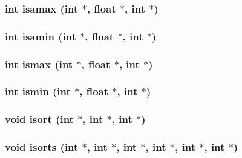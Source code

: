 \subsubsection{\setlength{\rightskip}{0pt plus 5cm}int isamax (int $\ast$, float $\ast$, int $\ast$)}\label{essl_8h_dbbeac12af3cfccc5b32aad8f83be325}


\subsubsection{\setlength{\rightskip}{0pt plus 5cm}int isamin (int $\ast$, float $\ast$, int $\ast$)}\label{essl_8h_32ac278a6a27427e5d14cbfe2cccdc0a}


\subsubsection{\setlength{\rightskip}{0pt plus 5cm}int ismax (int $\ast$, float $\ast$, int $\ast$)}\label{essl_8h_0366c0646cd53c1ddd19a9b1980bb53b}


\subsubsection{\setlength{\rightskip}{0pt plus 5cm}int ismin (int $\ast$, float $\ast$, int $\ast$)}\label{essl_8h_b8a15c4b653b233e6ca49a6cfbacfd3d}


\subsubsection{\setlength{\rightskip}{0pt plus 5cm}void isort (int $\ast$, int $\ast$, int $\ast$)}\label{essl_8h_5a2cd90ab6a36284d62715fa75c3856b}


\subsubsection{\setlength{\rightskip}{0pt plus 5cm}void isorts (int $\ast$, int $\ast$, int $\ast$, int $\ast$, int $\ast$, int $\ast$)}\label{essl_8h_5fbbd11607b10333044d0fed53108575}


